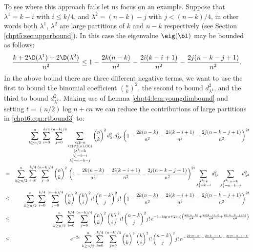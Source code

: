 \documentclass[11pt]{report}
\begin{document}
To see where this approach fails let us focus on an example. 
Suppose that $\lambda^{1} =k-i$ with $i \leq k/4$, and $\lambda^{2} = (n-k)-j$ with $j< (n-k)/4$, in other words both $\lambda^{1}$, $\lambda^{2}$ are large partitions of $k$ and $n-k$ respectively (see Section \ref{chpt5:sec:upperbound}). In this case the eigenvalue $\eig(\bl)$ may be bounded as follows:
\begin{eqnarray}
\frac{k +2\D(\lambda^{1})+2\D(\lambda^{2})}{n^{2}} \leq 1 -\frac{2k(n-k)}{n^{2}} - \frac{2i(k-i+1)}{n^{2}} - \frac{2j(n-k-j+1)}{n^{2}}.
\end{eqnarray} 
In the above bound there are three different negative terms, we want to use the first to bound the binomial coefficient ${n \choose k }^{2}$, the second to bound  $d_{\lambda^{1}}^{2}$, and the third to bound $d_{\lambda^{2}}^{2}$. Making use of Lemma \ref{chpt4:lem:youngdimbound} and setting $t = (n/2)\log n +cn$ we can reduce the contributions of large partitions in \eqref{chpt6:eqn:rtbound3} to:
\begin{eqnarray}
& & \sum_{k\geq n/2}^{n}  \,\sum_{i=0}^{k/4} \sum_{j=0}^{(n-k)/4} \sum_{\substack{\bl \vdash n \\ \bl \neq ((n),(0)) \\ |\lambda^{1} | = k \\ \lambda_{1}^{1} = k-i \\ \lambda_{1}^{2} = n-k -j }} {n \choose k}^{2}  \, d_{\lambda^{1}}^{2} d_{\lambda^{2}}^{2} \left(1 -\frac{2k(n-k)}{n^{2}} - \frac{2i(k-i+1)}{n^{2}} - \frac{2j(n-k-j+1)}{n^{2}}\right)^{2t} \nonumber\\
& = & \sum_{k\geq n/2}^{n}  \, \sum_{i=0}^{k/4} \sum_{j=0}^{(n-k)/4} {n \choose k}^{2} \, \left(1 -\frac{2k(n-k)}{n^{2}} - \frac{2i(k-i+1)}{n^{2}} - \frac{2j(n-k-j+1)}{n^{2}}\right)^{2t} \sum_{\substack{\lambda^{1} \vdash k \\ \lambda_{1}^{1} =k-i}}  d_{\lambda^{1}}^{2} \sum_{\substack{\lambda^{2} \vdash n-k \\ \lambda_{1}^{2} =n-k-j} } d_{\lambda^{2}}^{2} \nonumber\\
& \leq & \sum_{k\geq n/2}^{n}  \,\sum_{i=0}^{k/4} \, \sum_{j=0}^{(n-k)/4}  {n \choose k}^{2} \, {k \choose i}^{2} i! \, {n-k \choose j}^{2} j! \, \left(1 -\frac{2k(n-k)}{n^{2}} - \frac{2i(k-i+1)}{n^{2}} - \frac{2j(n-k-j+1)}{n^{2}}\right)^{2t} \nonumber\\ 
& \leq & \sum_{k\geq n/2}^{n} \, \sum_{i=0}^{k/4} \, \sum_{j=0}^{(n-k)/4} {n \choose k}^{2} \, {k \choose i}^{2} i! \, {n-k \choose j}^{2} j! \, e^{- (n\log n  +2cn )\left( \frac{2k(n-k)}{n^{2}} + \frac{2i(k-i+1)}{n^{2}} + \frac{2j(n-k-j+1)}{n^{2}} \right) }\nonumber\\
& \leq & e^{-2c} \,\sum_{k\geq n/2}^{n} \, \sum_{i=0}^{k/4} \, \sum_{j=0}^{(n-k)/4} {n \choose k}^{2} \, {k \choose i}^{2} i! \, {n-k \choose j}^{2} j! \, n^{-\frac{2k(n-k)}{n} - \frac{2i(k-i+1)}{n} - \frac{2j(n-k-j+1)}{n} } \label{chpt6:eqn:rtbound6}
\end{eqnarray}
\end{document}

